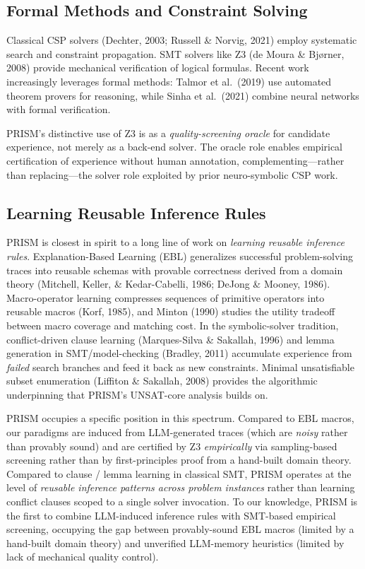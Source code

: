 \subsection{Formal Methods and Constraint Solving}

Classical CSP solvers (Dechter, 2003; Russell \& Norvig, 2021) employ systematic search and constraint propagation. SMT solvers like Z3 (de Moura \& Bjørner, 2008) provide mechanical verification of logical formulas. Recent work increasingly leverages formal methods: Talmor et al.~(2019) use automated theorem provers for reasoning, while Sinha et al.~(2021) combine neural networks with formal verification.

PRISM's distinctive use of Z3 is as a \textit{quality-screening oracle} for candidate experience, not merely as a back-end solver. The oracle role enables empirical certification of experience without human annotation, complementing—rather than replacing—the solver role exploited by prior neuro-symbolic CSP work.

\subsection{Learning Reusable Inference Rules}
\label{ssec:related-ebl}

PRISM is closest in spirit to a long line of work on \emph{learning reusable inference rules}. Explanation-Based Learning (EBL) generalizes successful problem-solving traces into reusable schemas with provable correctness derived from a domain theory (Mitchell, Keller, \& Kedar-Cabelli, 1986; DeJong \& Mooney, 1986). Macro-operator learning compresses sequences of primitive operators into reusable macros (Korf, 1985), and Minton (1990) studies the utility tradeoff between macro coverage and matching cost. In the symbolic-solver tradition, conflict-driven clause learning (Marques-Silva \& Sakallah, 1996) and lemma generation in SMT/model-checking (Bradley, 2011) accumulate experience from \emph{failed} search branches and feed it back as new constraints. Minimal unsatisfiable subset enumeration (Liffiton \& Sakallah, 2008) provides the algorithmic underpinning that PRISM's UNSAT-core analysis builds on.

PRISM occupies a specific position in this spectrum. Compared to EBL macros, our paradigms are induced from LLM-generated traces (which are \emph{noisy} rather than provably sound) and are certified by Z3 \emph{empirically} via sampling-based screening rather than by first-principles proof from a hand-built domain theory. Compared to clause / lemma learning in classical SMT, PRISM operates at the level of \emph{reusable inference patterns across problem instances} rather than learning conflict clauses scoped to a single solver invocation. To our knowledge, PRISM is the first to combine LLM-induced inference rules with SMT-based empirical screening, occupying the gap between provably-sound EBL macros (limited by a hand-built domain theory) and unverified LLM-memory heuristics (limited by lack of mechanical quality control).
